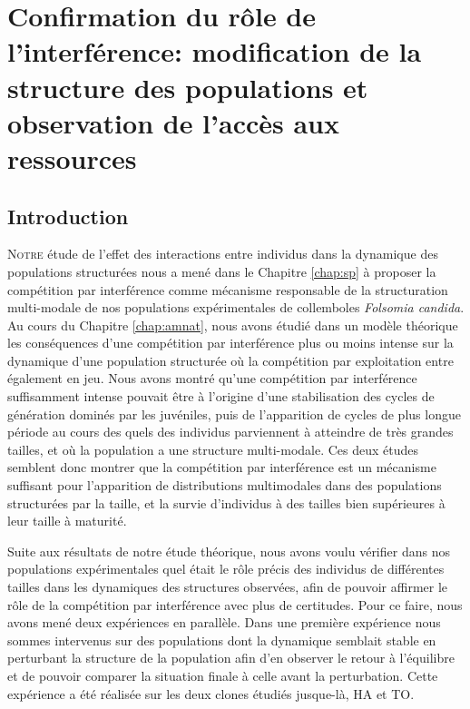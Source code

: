 \chapter{Confirmation du rôle de l'interférence: modification de la structure
des populations et observation de l'accès aux ressources}
\label{chap:sm}

\vspace{5cm}

\section{Introduction}

\lettrine[lines=3]{N}{otre} étude de l'effet des interactions entre individus
dans la dynamique des populations structurées nous a mené dans le Chapitre \ref{chap:sp} à proposer la
compétition par interférence comme mécanisme responsable de la structuration
multi-modale de nos populations expérimentales de collemboles \textit{Folsomia
candida}. Au cours du Chapitre \ref{chap:amnat}, nous avons étudié dans un
modèle théorique les conséquences d'une compétition par interférence plus ou
moins intense sur la dynamique d'une population structurée où la compétition par
exploitation entre également en jeu. Nous avons montré qu'une compétition par
interférence suffisamment intense pouvait être à l'origine d'une stabilisation
des cycles de génération dominés par les juvéniles, puis de l'apparition de
cycles de plus longue période au cours des quels des individus parviennent à
atteindre de très grandes tailles, et où la population a une structure
multi-modale. Ces deux études semblent donc montrer que la compétition par
interférence est un mécanisme suffisant pour l'apparition de distributions
multimodales dans des populations structurées par la taille, et la survie
d'individus à des tailles bien supérieures à leur taille à maturité.

Suite aux résultats de notre étude théorique, nous avons voulu vérifier dans nos
populations expérimentales quel était le rôle précis des individus de
différentes tailles dans les dynamiques des structures observées, afin de
pouvoir affirmer le rôle de la compétition par interférence avec plus de certitudes.
Pour ce faire, nous avons mené deux expériences en parallèle. Dans une première
expérience nous sommes intervenus sur des populations dont la dynamique semblait
stable en perturbant la structure de la population afin d'en observer le retour
à l'équilibre et de pouvoir comparer la situation finale à celle avant la
perturbation. Cette expérience a été réalisée sur les deux clones étudiés
jusque-là, HA et TO.

